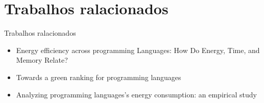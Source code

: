 \section{Trabalhos ralacionados}

\begin{frame}{Trabalhos ralacionados}
    \begin{itemize}
        \item Energy efficiency across programming Languages: How Do Energy, Time, and
        Memory Relate?
        \item Towards a green ranking for programming languages
        \item Analyzing programming languages’s energy consumption: an empirical study
    \end{itemize}
\end{frame}

